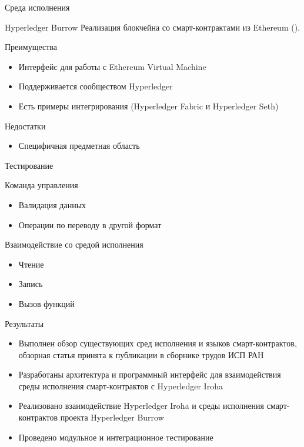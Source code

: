 \documentclass[hyperref={pdfpagelabels=false}]{beamer}
\begin{document}
\begin{frame}{Среда исполнения}
\begin{block}{Hyperledger Burrow}
Реализация блокчейна со смарт-контрактами из Ethereum ({\color{blue}{https://github.com/hyperledger/burrow}}).
\end{block}
\vfill
\begin{block}{Преимущества}
\begin{itemize}
\item Интерфейс для работы с Ethereum Virtual Machine
\vfill
\item Поддерживается сообществом Hyperledger
\vfill
\item Есть примеры интегрирования (Hyperledger Fabric и Hyperledger Seth)
\end{itemize}
\end{block}
\vfill
\begin{block}{Недостатки}
\begin{itemize}
\item Специфичная предметная область 
\end{itemize}
\end{block}

\end{frame} 

\begin{frame}{Тестирование}
\begin{block}{Команда управления}
\begin{itemize}
\item Валидация данных
\vfill
\item Операции по переводу в другой формат
\end{itemize}
\end{block}
\vfill
\begin{block}{Взаимодействие со средой исполнения}
\begin{itemize}
\item Чтение
\vfill
\item Запись
\vfill
\item Вызов функций
\end{itemize}
\end{block}
\end{frame} 

\begin{frame}{Результаты}
\begin{itemize}
\item Выполнен обзор существующих сред исполнения и языков смарт-контрактов, обзорная статья принята к публикации в сборнике трудов ИСП РАН
\vfill
\item Разработаны архитектура и программный интерфейс для взаимодействия среды исполнения смарт-контрактов с Hyperledger Iroha
\vfill
\item Реализовано взаимодействие Hyperledger Iroha и среды исполнения смарт-контрактов проекта Hyperledger Burrow
\vfill
\item Проведено модульное и интеграционное тестирование
\end{itemize}
\end{frame} 
\end{document}
